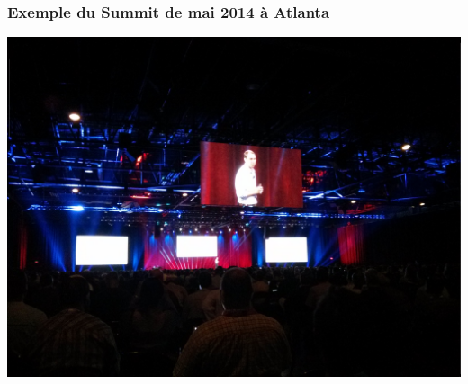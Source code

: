   \begin{frame}
    \frametitle{Exemple du Summit de mai 2014 à Atlanta}
    \includegraphics[width=\textwidth]{images/photo-summit1.jpg}
  \end{frame}

